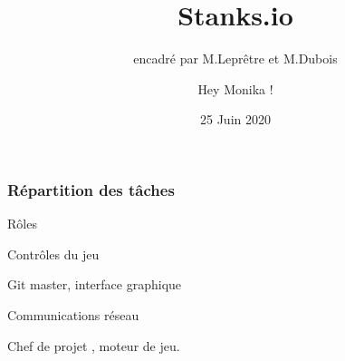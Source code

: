 \documentclass[french,t]{beamer}
\title{Stanks.io}
\subtitle{encadré par M.Leprêtre et M.Dubois}
\author{Hey Monika !}
\institute{ULCO}
\date{25 Juin 2020}
\begin{document}
	\begin{frame}
		\maketitle
	\end{frame}
	\begin{frame}
		\frametitle{Répartition des tâches}
		\begin{block}{Rôles}
			\begin{description}
				\item<1->[Pecqueux Théo :] Contrôles du jeu
				\item<2->[Huyghes Antoine :] Git master, interface graphique
				\item<3->[Villette Vincent :] Communications réseau
				\item<4->[Skibinski Pierre :] Chef de projet , moteur de jeu.
			\end{description}
		\end{block}
	\end{frame}
\end{document}
